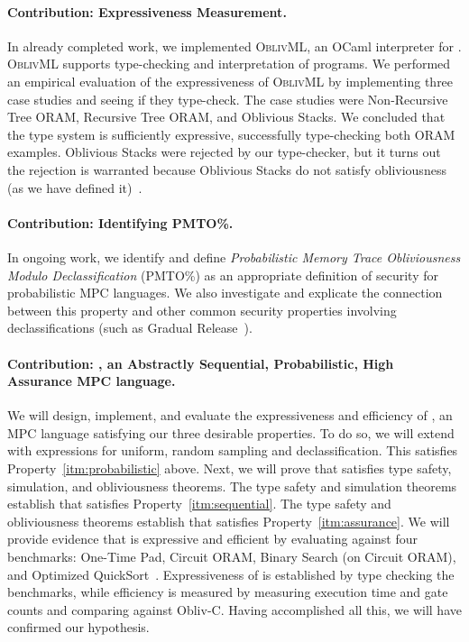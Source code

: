 \paragraph{Contribution: \obliv Expressiveness Measurement.} In already completed work, we implemented \textsc{OblivML}, an OCaml
interpreter for \obliv. \textsc{OblivML} supports type-checking and interpretation of \obliv programs. We performed an empirical
evaluation of the expressiveness of \textsc{OblivML} by implementing three case studies and seeing if they type-check.
The case studies were Non-Recursive Tree ORAM, Recursive Tree ORAM, and Oblivious Stacks. We concluded that the type system is
sufficiently expressive, successfully type-checking both ORAM examples. Oblivious Stacks were rejected by our type-checker, but
it turns out the rejection is warranted because Oblivious Stacks do not satisfy obliviousness (as we have defined it)~\cite{todo}.

\paragraph{Contribution: Identifying PMTO\%.} In ongoing work, we identify and define \emph{Probabilistic Memory Trace Obliviousness Modulo Declassification}
(PMTO\%) as an appropriate definition of security for probabilistic MPC languages. We also investigate and explicate the connection between
this property and other common security properties involving declassifications (such as Gradual Release~\cite{todo}).

\paragraph{Contribution: \lang, an \textbf{Abstractly Sequential}, \textbf{Probabilistic}, \textbf{High Assurance} MPC language.}
We will design, implement, and evaluate the expressiveness and efficiency of \lang, an MPC language satisfying our three desirable
properties. To do so, we will extend \mpc with expressions for uniform, random sampling and declassification. This satisfies
Property~\ref{itm:probabilistic} above. Next, we will prove that \lang satisfies type safety, simulation, and obliviousness theorems.
The type safety and simulation theorems establish that \lang satisfies Property~\ref{itm:sequential}. The type safety and obliviousness
theorems establish that \lang satisfies Property~\ref{itm:assurance}. We will provide evidence that \lang is expressive and efficient
by evaluating \lang against four benchmarks: One-Time Pad, Circuit ORAM, Binary Search (on Circuit ORAM), and Optimized QuickSort~\cite{}.
Expressiveness of \lang is established by type checking the benchmarks, while efficiency is measured by measuring execution time and
gate counts and comparing against Obliv-C. Having accomplished all this, we will have confirmed our hypothesis.


